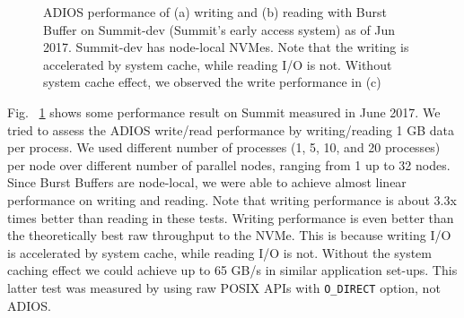 \begin{figure}[h]
\center
{}
\caption{ADIOS performance of (a) writing and (b) reading with Burst Buffer on Summit-dev (Summit's early access system) as of Jun 2017. Summit-dev has node-local NVMes. Note that the writing is accelerated by system cache, while reading I/O is not. Without system cache effect, we observed the write performance in (c)}
\label{fig:summit}
\end{figure}

Fig. ~\ref{fig:summit} shows some performance result on Summit measured in June 2017. We tried to assess the ADIOS write/read performance by writing/reading 1 GB data per process. We used different number of processes (1, 5, 10, and 20 processes) per node over different number of parallel nodes, ranging from 1 up to 32 nodes. Since Burst Buffers are node-local, we were able to achieve almost linear performance on writing and reading.  Note that writing performance is about 3.3x times better than reading in these tests. Writing performance is even better than the theoretically best raw throughput to the NVMe. This is because writing I/O is accelerated by system cache, while reading I/O is not. Without the system caching effect we could achieve up to 65 GB/s in similar application set-ups. This latter test was measured by using raw POSIX APIs with \verb+O_DIRECT+ option, not ADIOS.

